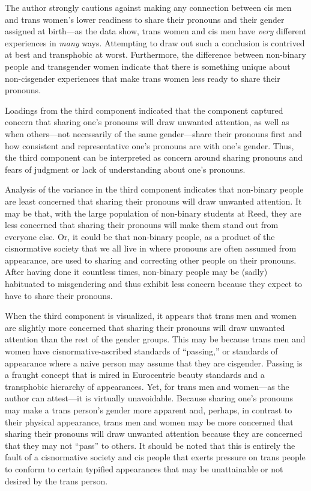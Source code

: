 \documentclass[12pt,twoside]{reedthesis}
\begin{document}
The author strongly cautions against making any connection between cis men and trans women's lower readiness to share their pronouns and their gender assigned at birth---as the data show, trans women and cis men have \emph{very} different experiences in \emph{many} ways. Attempting to draw out such a conclusion is contrived at best and transphobic at worst. Furthermore, the difference between non-binary people and transgender women indicate that there is something unique about non-cisgender experiences that make trans women less ready to share their pronouns.

Loadings from the third component indicated that the component captured concern that sharing one's pronouns will draw unwanted attention, as well as when others---not necessarily of the same gender---share their pronouns first and how consistent and representative one's pronouns are with one's gender. Thus, the third component can be interpreted as concern around sharing pronouns and fears of judgment or lack of understanding about one's pronouns.

Analysis of the variance in the third component indicates that non-binary people are least concerned that sharing their pronouns will draw unwanted attention. It may be that, with the large population of non-binary students at Reed, they are less concerned that sharing their pronouns will make them stand out from everyone else. Or, it could be that non-binary people, as a product of the cisnormative society that we all live in where pronouns are often assumed from appearance, are used to sharing and correcting other people on their pronouns. After having done it countless times, non-binary people may be (sadly) habituated to misgendering and thus exhibit less concern because they expect to have to share their pronouns.

When the third component is visualized, it appears that trans men and women are slightly more concerned that sharing their pronouns will draw unwanted attention than the rest of the gender groups. This may be because trans men and women have cisnormative-ascribed standards of ``passing,'' or standards of appearance where a naive person may assume that they are cisgender. Passing is a fraught concept that is mired in Eurocentric beauty standards and a transphobic hierarchy of appearances. Yet, for trans men and women---as the author can attest---it is virtually unavoidable. Because sharing one's pronouns may make a trans person's gender more apparent and, perhaps, in contrast to their physical appearance, trans men and women may be more concerned that sharing their pronouns will draw unwanted attention because they are concerned that they may not ``pass'' to others. It should be noted that this is entirely the fault of a cisnormative society and cis people that exerts pressure on trans people to conform to certain typified appearances that may be unattainable or not desired by the trans person.
\end{document}
